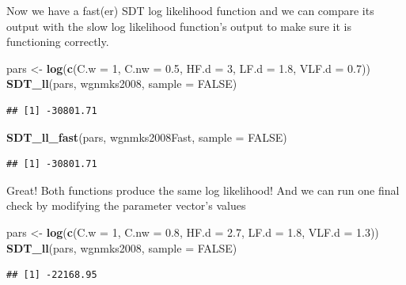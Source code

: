 \documentclass[]{book}
\newenvironment{Shaded}{\begin{snugshade}}{\end{snugshade}}
\newcommand{\DataTypeTok}[1]{\textcolor[rgb]{0.13,0.29,0.53}{#1}}
\newcommand{\DecValTok}[1]{\textcolor[rgb]{0.00,0.00,0.81}{#1}}
\newcommand{\FloatTok}[1]{\textcolor[rgb]{0.00,0.00,0.81}{#1}}
\newcommand{\KeywordTok}[1]{\textcolor[rgb]{0.13,0.29,0.53}{\textbf{#1}}}
\newcommand{\NormalTok}[1]{#1}
\newcommand{\OtherTok}[1]{\textcolor[rgb]{0.56,0.35,0.01}{#1}}
\newcommand{\StringTok}[1]{\textcolor[rgb]{0.31,0.60,0.02}{#1}}
\begin{document}
Now we have a fast(er) SDT log likelihood function and we can compare its output with the slow log likelihood function's output to make sure it is functioning correctly.

\begin{Shaded}
\begin{Highlighting}[]
\NormalTok{pars <-}\StringTok{ }\KeywordTok{log}\NormalTok{(}\KeywordTok{c}\NormalTok{(}\DataTypeTok{C.w =} \DecValTok{1}\NormalTok{, }\DataTypeTok{C.nw =} \FloatTok{0.5}\NormalTok{, }\DataTypeTok{HF.d =} \DecValTok{3}\NormalTok{, }\DataTypeTok{LF.d =} \FloatTok{1.8}\NormalTok{, }\DataTypeTok{VLF.d =} \FloatTok{0.7}\NormalTok{))}
\KeywordTok{SDT_ll}\NormalTok{(pars, wgnmks2008, }\DataTypeTok{sample =} \OtherTok{FALSE}\NormalTok{)}
\end{Highlighting}
\end{Shaded}

\begin{verbatim}
## [1] -30801.71
\end{verbatim}

\begin{Shaded}
\begin{Highlighting}[]
\KeywordTok{SDT_ll_fast}\NormalTok{(pars, wgnmks2008Fast, }\DataTypeTok{sample =} \OtherTok{FALSE}\NormalTok{)}
\end{Highlighting}
\end{Shaded}

\begin{verbatim}
## [1] -30801.71
\end{verbatim}

Great! Both functions produce the same log likelihood! And we can run one final check by modifying the parameter vector's values

\begin{Shaded}
\begin{Highlighting}[]
\NormalTok{pars <-}\StringTok{ }\KeywordTok{log}\NormalTok{(}\KeywordTok{c}\NormalTok{(}\DataTypeTok{C.w =} \DecValTok{1}\NormalTok{, }\DataTypeTok{C.nw =} \FloatTok{0.8}\NormalTok{, }\DataTypeTok{HF.d =} \FloatTok{2.7}\NormalTok{, }\DataTypeTok{LF.d =} \FloatTok{1.8}\NormalTok{, }\DataTypeTok{VLF.d =} \FloatTok{1.3}\NormalTok{))}
\KeywordTok{SDT_ll}\NormalTok{(pars, wgnmks2008, }\DataTypeTok{sample =} \OtherTok{FALSE}\NormalTok{)}
\end{Highlighting}
\end{Shaded}

\begin{verbatim}
## [1] -22168.95
\end{verbatim}
\end{document}
